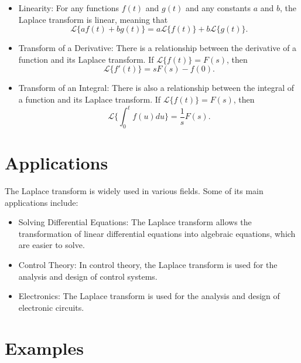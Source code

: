 \documentclass{article}
\begin{document}
\begin{itemize}
\item Linearity: For any functions $f(t)$ and $g(t)$ and any constants $a$ and $b$, the Laplace transform is linear, meaning that
\begin{equation}
\mathcal{L}\{af(t) + bg(t)\} = a\mathcal{L}\{f(t)\} + b\mathcal{L}\{g(t)\}.
\end{equation}

\item Transform of a Derivative: There is a relationship between the derivative of a function and its Laplace transform. If $\mathcal{L}\{f(t)\} = F(s)$, then
\begin{equation}
\mathcal{L}\{f'(t)\} = sF(s) - f(0).
\end{equation}

\item Transform of an Integral: There is also a relationship between the integral of a function and its Laplace transform. If $\mathcal{L}\{f(t)\} = F(s)$, then
\begin{equation}
\mathcal{L}\{\int_{0}^{t} f(u) du\} = \frac{1}{s}F(s).
\end{equation}
\end{itemize}

\section{Applications}

The Laplace transform is widely used in various fields. Some of its main applications include:

\begin{itemize}
\item Solving Differential Equations: The Laplace transform allows the transformation of linear differential equations into algebraic equations, which are easier to solve.

\item Control Theory: In control theory, the Laplace transform is used for the analysis and design of control systems.

\item Electronics: The Laplace transform is used for the analysis and design of electronic circuits.

\end{itemize}

\section{Examples}
\end{document}
